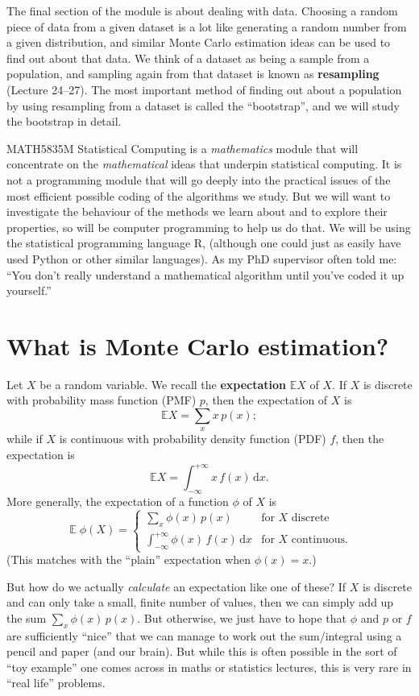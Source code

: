 \documentclass[
  letterpaper,
  DIV=11,
  numbers=noendperiod]{scrreprt}
\newcommand{\Exg}{\operatorname{\mathbb{E}}}
\newcommand{\Ex}{\mathbb{E}}
\theoremstyle{plain}
\theoremstyle{definition}
\theoremstyle{definition}
\theoremstyle{remark}
\begin{document}
The final section of the module is about dealing with data. Choosing a
random piece of data from a given dataset is a lot like generating a
random number from a given distribution, and similar Monte Carlo
estimation ideas can be used to find out about that data. We think of a
dataset as being a sample from a population, and sampling again from
that dataset is known as \textbf{resampling} (Lecture 24--27). The most
important method of finding out about a population by using resampling
from a dataset is called the ``bootstrap'', and we will study the
bootstrap in detail.

MATH5835M Statistical Computing is a \emph{mathematics} module that will
concentrate on the \emph{mathematical} ideas that underpin statistical
computing. It is not a programming module that will go deeply into the
practical issues of the most efficient possible coding of the algorithms
we study. But we will want to investigate the behaviour of the methods
we learn about and to explore their properties, so will be computer
programming to help us do that. We will be using the statistical
programming language R, (although one could just as easily have used
Python or other similar languages). As my PhD supervisor often told me:
``You don't really understand a mathematical algorithm until you've
coded it up yourself.''

\section{What is Monte Carlo
estimation?}\label{what-is-monte-carlo-estimation}

Let \(X\) be a random variable. We recall the \textbf{expectation}
\(\Ex X\) of \(X\). If \(X\) is discrete with probability mass function
(PMF) \(p\), then the expectation of \(X\) is
\[ \Ex X = \sum_x x\,p(x) ;\] while if \(X\) is continuous with
probability density function (PDF) \(f\), then the expectation is
\[ \Ex X = \int_{-\infty}^{+\infty} x\,f(x)\,\mathrm{d}x . \] More
generally, the expectation of a function \(\phi\) of \(X\) is
\[ \Exg \phi(X) = \begin{cases} {\displaystyle \sum_x \phi(x)\,p(x)} & \text{for $X$ discrete}\\ {\displaystyle \int_{-\infty}^{+\infty} \phi(x)\,f(x)\,\mathrm{d}x}  & \text{for $X$ continuous.} \end{cases}\]
(This matches with the ``plain'' expectation when \(\phi(x) = x\).)

But how do we actually \emph{calculate} an expectation like one of
these? If \(X\) is discrete and can only take a small, finite number of
values, then we can simply add up the sum \(\sum_x \phi(x)\,p(x)\). But
otherwise, we just have to hope that \(\phi\) and \(p\) or \(f\) are
sufficiently ``nice'' that we can manage to work out the sum/integral
using a pencil and paper (and our brain). But while this is often
possible in the sort of ``toy example'' one comes across in maths or
statistics lectures, this is very rare in ``real life'' problems.
\end{document}
